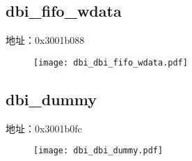 \subsection{dbi\_fifo\_wdata}
\label{dbi-dbi-fifo-wdata}
地址：0x3001b088
 \begin{figure}[H]
\texttt{[image: dbi\_dbi\_fifo\_wdata.pdf]}
\end{figure}

\subsection{dbi\_dummy}
\label{dbi-dbi-dummy}
地址：0x3001b0fc
 \begin{figure}[H]
\texttt{[image: dbi\_dbi\_dummy.pdf]}
\end{figure}

